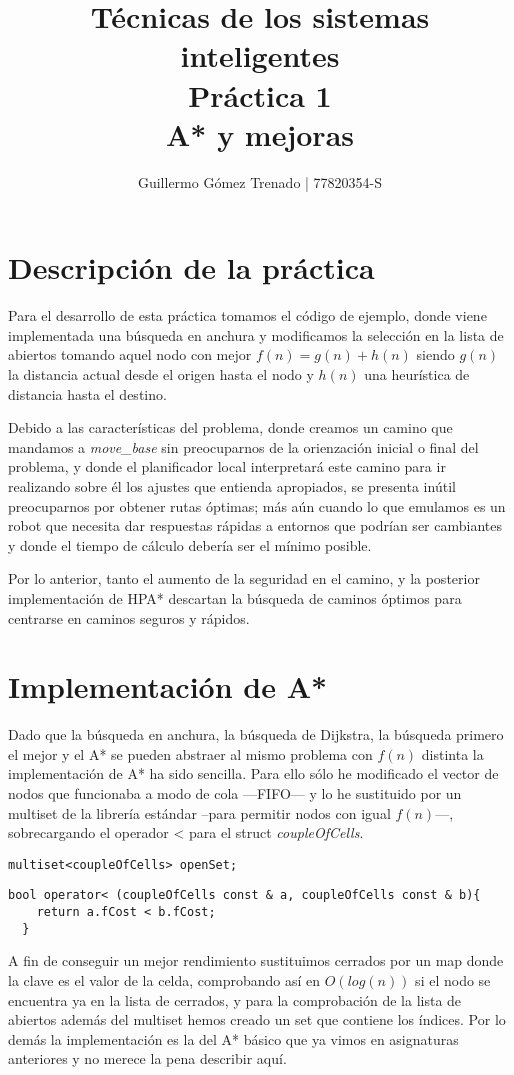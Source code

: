 \documentclass{article}
\title{Técnicas de los sistemas inteligentes\\
Práctica 1\\
A* y mejoras}
\author{Guillermo G\'omez Trenado | 77820354-S}
\begin{document}

\maketitle

\tableofcontents

\newpage
\section{Descripción de la práctica}

Para el desarrollo de esta práctica tomamos el código de ejemplo, donde viene implementada una búsqueda en anchura y modificamos la selección en la lista de abiertos tomando aquel nodo con mejor $ f\left (n  \right )=g\left ( n \right )+ h\left ( n \right ) $ siendo $ g\left(n\right) $ la distancia actual desde el origen hasta el nodo y $ h\left(n\right) $ una heurística de distancia hasta el destino. 

Debido a las características del problema, donde creamos un camino que mandamos a \emph{move\_base} sin preocuparnos de la orienzación inicial o final del problema, y donde el planificador local interpretará este camino para ir realizando sobre él los ajustes que entienda apropiados, se presenta inútil preocuparnos por obtener rutas óptimas; más aún cuando lo que emulamos es un robot que necesita dar respuestas rápidas a entornos que podrían ser cambiantes y donde el tiempo de cálculo debería ser el mínimo posible. 

Por lo anterior, tanto el aumento de la seguridad en el camino, y la posterior implementación de HPA* descartan la búsqueda de caminos óptimos para centrarse en caminos seguros y rápidos.


\section{Implementación de A*}

Dado que la búsqueda en anchura, la búsqueda de Dijkstra, la búsqueda primero el mejor y el A* se pueden abstraer al mismo problema con $f\left(n\right)$ distinta la implementación de A* ha sido sencilla. Para ello sólo he modificado el vector de nodos que funcionaba a modo de cola ---FIFO--- y lo he sustituido por un multiset de la librería estándar --para permitir nodos con igual $f\left(n\right)$---, sobrecargando el operador < para el struct \emph{coupleOfCells}.
\begin{lstlisting}[frame=single]
  multiset<coupleOfCells> openSet;
\end{lstlisting}
\begin{lstlisting}[frame=single]
  bool operator< (coupleOfCells const & a, coupleOfCells const & b){
    return a.fCost < b.fCost;
  }
\end{lstlisting}
A fin de conseguir un mejor rendimiento sustituimos cerrados por un map donde la clave es el valor de la celda, comprobando así en $O(log(n))$ si el nodo se encuentra ya en la lista de cerrados, y para la comprobación de la lista de abiertos además del multiset hemos creado un set que contiene los índices. Por lo demás la implementación es la del A* básico que ya vimos en asignaturas anteriores y no merece la pena describir aquí.
\end{document}
